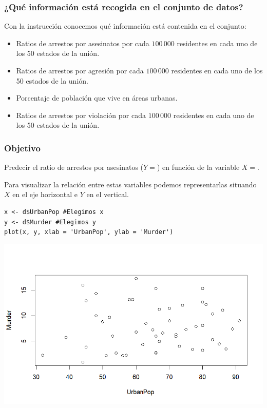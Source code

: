 \subsubsection*{¿Qué información está recogida en el conjunto de datos?}
Con la instrucción  conocemos qué información está contenida en el conjunto:
\begin{itemize}
\item {} Ratios de arrestos por asesinatos por cada $100\,000$ residentes en cada uno de los 50 estados de la unión.
\item {} Ratios de arrestos por agresión por cada $100\,000$ residentes en cada uno de los 50 estados de la unión.
\item {} Porcentaje de población que vive en áreas urbanas.
\item {} Ratios de arrestos por violación por cada $100\,000$ residentes en cada uno de los 50 estados de la unión.
\end{itemize}
\subsubsection{Objetivo}

Predecir el ratio de arrestos por asesinatos ($Y=$) en función de la variable $X=$.

\begin{figure}
\end{figure}

Para visualizar la relación entre estas variables podemos representarlas situando $X$ en el eje horizontal e $Y$ en el vertical.

\begin{lstlisting}
x <- d$UrbanPop #Elegimos x
y <- d$Murder #Elegimos y
plot(x, y, xlab = 'UrbanPop', ylab = 'Murder')
\end{lstlisting}

\begin{center}
\includegraphics[scale=0.7]{"Temas/Imágenes/Tema 2/000005"}
\end{center}

